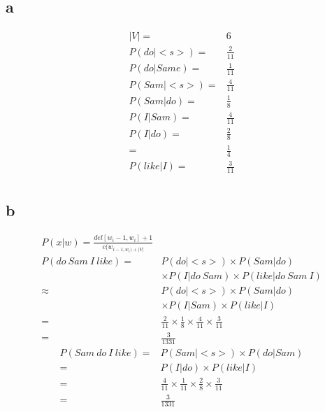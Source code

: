 \documentclass{article}
\begin{document}
    \subsection*{a}
    \begin{equation*}
        \begin{split}
            |V|=&6\\
            P(do|<s>)=&\frac{2}{11}\\
            P(do|Same)=&\frac{1}{11}\\
            P(Sam|<s>)=&\frac{4}{11}\\
            P(Sam|do)=&\frac{1}{8}\\
            P(I|Sam)=&\frac{4}{11}\\
            P(I|do)=&\frac{2}{8}\\
                    =&\frac{1}{4}\\
            P(like|I)=&\frac{3}{11}\\
        \end{split}
    \end{equation*}
    \subsection*{b}
    \begin{equation*}
        \begin{split}
            P(x|w)=\frac{del[w_i-1,w_i]+1}{c(w_{i-1,w_i)+|V|}}\\
            P(do \ Sam \ I \ like)=&P(do|<s>)\times P(Sam|do)\\
                            &\times P(I|do\ Sam)\times P(like|do\ Sam\ I)\\
                            \approx&P(do|<s>)\times P(Sam|do)\\
                            &\times P(I|Sam)\times P(like|I)\\
                            =&\frac{2}{11}\times\frac{1}{8}\times\frac{4}{11}\times\frac{3}{11}\\
                            =&\frac{3}{1331}
        \end{split}
    \end{equation*}
    \begin{equation*}
        \begin{split}
            P(Sam \ do\  I \ like)=&P(Sam|<s>)\times P(do|Sam)\\
                                =&P(I|do)\times P(like|I)\\
                                =&\frac{4}{11}\times\frac{1}{11}\times\frac{2}{8}\times\frac{3}{11}\\
                                =&\frac{3}{1331}
        \end{split}
    \end{equation*}
    
\end{document}
